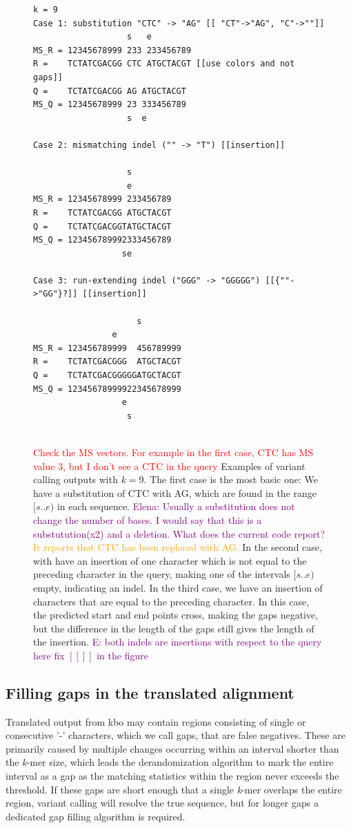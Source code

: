 \documentclass[unnumsec,webpdf,contemporary,large]{oup-authoring-template}%
\theoremstyle{thmstyleone}%
\theoremstyle{thmstyletwo}%
\theoremstyle{thmstylethree}%
\begin{document}
\begin{figure}
\begin{verbatim}
k = 9
Case 1: substitution "CTC" -> "AG" [[ "CT"->"AG", "C"->""]] 
                   s   e
MS_R = 12345678999 233 233456789
R =    TCTATCGACGG CTC ATGCTACGT [[use colors and not gaps]]
Q =    TCTATCGACGG AG ATGCTACGT
MS_Q = 12345678999 23 333456789
                   s  e

Case 2: mismatching indel ("" -> "T") [[insertion]]

                   s
                   e 
MS_R = 12345678999 233456789
R =    TCTATCGACGG ATGCTACGT
Q =    TCTATCGACGGTATGCTACGT
MS_Q = 123456789992333456789
                  se

Case 3: run-extending indel ("GGG" -> "GGGGG") [[{""->"GG"}?]] [[insertion]]

                     s
                e
MS_R = 123456789999  456789999
R =    TCTATCGACGGG  ATGCTACGT
Q =    TCTATCGACGGGGGATGCTACGT
MS_Q = 12345678999922345678999
                  e
                   s
               
\end{verbatim}
\caption{\textcolor{red}{Check the MS vectors. For example in the first case, CTC has MS value 3, but I don't see a CTC in the query} Examples of variant calling outputs with $k=9$.
The first case is the most basic one: We have a substitution of CTC with AG, which are found in the range $[s..e)$ in each sequence. \textcolor{purple}{Elena: Usually a substitution does not change the number of bases. I would say that this is a substutution(x2) and a deletion. What does the current code report?} \textcolor{orange}{It reports that CTC has been replaced with AG.} In the second case, with have an insertion of one character which is not equal to the preceding character in the query, making one of the intervals $[s..e)$ empty, indicating an indel. In the third case, we have an insertion of characters that are equal to the preceding character. In this case, the predicted start and end points cross, making the gaps negative, but the difference in the length of the gaps still gives the length of the insertion. \textcolor{purple}{E: both indels are insertions with respect to the query here} \textcolor{purple}{fix $[[]]$ in the figure }}\label{fig:variantcall}
\end{figure}

\subsection{Filling gaps in the translated alignment}
Translated output from {\sf kbo} may contain regions consisting of single or consecutive '-' characters, which we call gaps, that are false negatives. These are primarily caused by multiple changes occurring within an interval shorter than the \emph{k}-mer size, which leads the derandomization algorithm to mark the entire interval as a gap as the matching statistics within the region never exceeds the threshold. If these gaps are short enough that a single \emph{k}-mer overlaps the entire region, variant calling will resolve the true sequence, but for longer gaps a dedicated gap filling algorithm is required.
\end{document}
